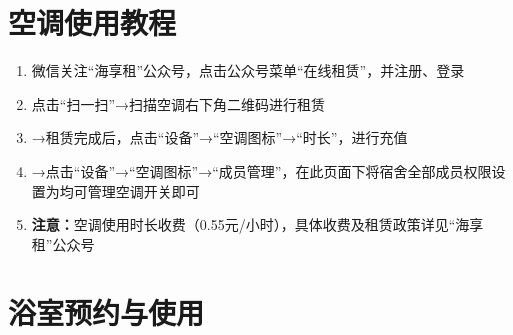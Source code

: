 \section[空调使用教程]{空调使用教程}
\label{air_control}
\begin{enumerate}
      \item 微信关注“海享租”公众号，点击公众号菜单“在线租赁”，并注册、登录
      \item 点击“扫一扫”→扫描空调右下角二维码进行租赁\footnotemark
      \item →租赁完成后，点击“设备”→“空调图标”→“时长”，进行充值
      \item →点击“设备”→“空调图标”→“成员管理”，在此页面下将宿舍全部成员权限设置为均可管理空调开关即可
      \item \textbf{注意：}空调使用时长收费（0.55元/小时），具体收费及租赁政策详见“海享租”公众号
\end{enumerate}

\section[浴室预约与使用]{浴室预约与使用}
